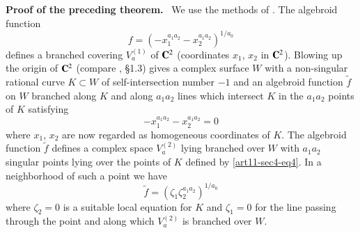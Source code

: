 \noindent
{\bf Proof of the preceding theorem.}~ We use the methods of \cite{art11-key6}. The algebroid function
$$
f=(-x_{1}^{a_{1}a_{2}}-x_{2}^{a_{1}a_{2}})^{1/a_{0}}
$$
defines a branched covering $V^{(1)}_{a}$ of $\mathbf{C}^{2}$ (coordinates $x_{1}$, $x_{2}$ in $\mathbf{C}^{2}$). Blowing up the origin of $\mathbf{C}^{2}$ (compare \cite{art11-key6}, \S1.3) gives a complex surface $W$ with a non-singular rational curve $K\subset W$ of self-intersection number $-1$ and an algebroid function $\widetilde{f}$ on $W$ branched along $K$ and along $a_{1}a_{2}$ lines which intersect $K$ in the $a_{1}a_{2}$ points of $K$ satisfying
\begin{equation}
-x_{1}^{a_{1}a_{2}}-x_{2}^{a_{1}a_{2}}=0\label{art11-sec4-eq4}
\end{equation}
where $x_{1}$, $x_{2}$ are now regarded as homogeneous coordinates of $K$. The algebroid function $\widetilde{f}$ defines a complex space $V^{(2)}_{a}$ lying branched over $W$ with $a_{1}a_{2}$ singular points lying over the points of $K$ defined by \eqref{art11-sec4-eq4}. In a neighborhood of such a point we have
\begin{equation}
\widetilde{f}=(\zeta_{1}\zeta_{2}^{a_{1}a_{2}})^{1/a_{0}}\label{art11-sec4-eq5}
\end{equation}
where $\zeta_{2}=0$ is a suitable local equation for $K$ and $\zeta_{1}=0$ for the line passing through the point and along which $V^{(2)}_{a}$ is branched over $W$.\pageoriginale %
